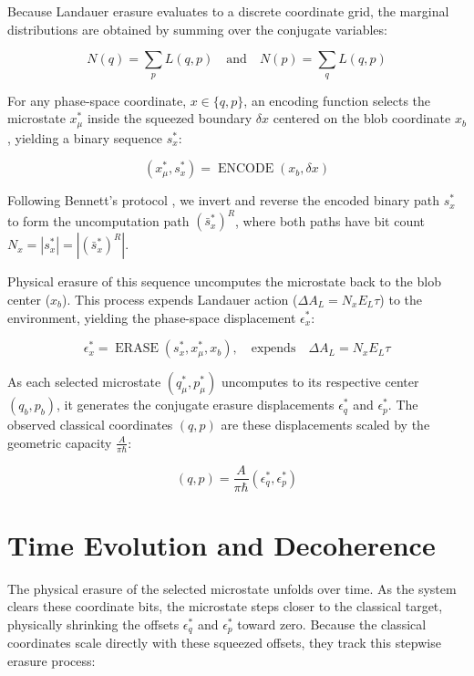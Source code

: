 \documentclass[%
  aps, reprint, prl, amsmath,amssymb
]{revtex4-2}
\begin{document}
Because Landauer erasure evaluates to a discrete coordinate grid, the marginal distributions are obtained by summing over the conjugate variables:

\begin{equation}
\label{eq:Marginals}
N(q) = \sum_{p} L(q,p)
\quad \text{and} \quad
N(p) = \sum_{q} L(q,p)
\end{equation}

For any phase-space coordinate, $x \in \{q, p\}$, an encoding function selects the microstate $x_\mu^*$ inside the squeezed boundary $\delta x$ centered on the blob coordinate $x_b$, yielding a binary sequence $s_x^*$:

\begin{equation}
\label{eq:EncoderFunction}
(x_\mu^*, s_x^*) = \operatorname{ENCODE}(x_b, \delta x)
\end{equation}

Following Bennett's protocol \cite{Bennett1973}, we invert and reverse the encoded binary path $s_x^*$ to form the uncomputation path $(\bar{s}_x^*)^R$, where both paths have bit count $N_x = |s_x^*| = |(\bar{s}_x^*)^R|$.

Physical erasure of this sequence uncomputes the microstate back to the blob center ($x_b$). This process expends Landauer action ($\Delta A_L = N_x E_L \tau$) to the environment, yielding the phase-space displacement $\epsilon_x^*$:

\begin{equation}
\label{eq:ErasureFunction}
\epsilon_x^* = \operatorname{ERASE}(s_x^*, x_\mu^*, x_b), \quad \text{expends} \quad \Delta A_L = N_x E_L \tau
\end{equation}

As each selected microstate $(q_\mu^*, p_\mu^*)$ uncomputes to its respective center $(q_b, p_b)$, it generates the conjugate erasure displacements $\epsilon_q^*$ and $\epsilon_p^*$. The observed classical coordinates $(q,p)$ are these displacements scaled by the geometric capacity $\frac{A}{\pi \hbar}$:

\begin{equation}
\label{eq:ObservedCoordinates}
(q,p) = \frac{A}{\pi \hbar} (\epsilon_q^*,\epsilon_p^*)
\end{equation}

\section{Time Evolution and Decoherence}

The physical erasure of the selected microstate unfolds over time. As the system clears these coordinate bits, the microstate steps closer to the classical target, physically shrinking the offsets $\epsilon_q^*$ and $\epsilon_p^*$ toward zero. Because the classical coordinates scale directly with these squeezed offsets, they track this stepwise erasure process:
\end{document}

